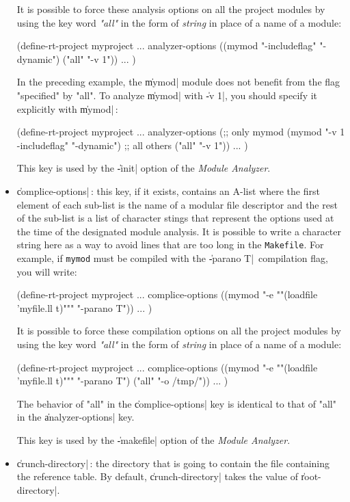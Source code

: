 \begin{itemize}
It is possible to force these analysis options on all the project modules by using the key word {\em "all"} in the form of {\it
string} in place of a name of a module:
\begin{Code*}
(define-rt-project myproject
  ...
  analyzer-options ((mymod "-includeflag" "-dynamic")
                    ("all" "-v 1"))
  ...
)
\end{Code*}
In the preceding example, the \|mymod| module does not benefit from the flag "specified" by "all".  To analyze \|mymod| with \|-v 1|, you should specify it explicitly with \|mymod|\,:
\begin{Code*}
(define-rt-project myproject
  ...
  analyzer-options (;; only mymod
                    (mymod "-v 1 -includeflag" "-dynamic")
                    ;; all others
                    ("all" "-v 1"))
  ...
)
\end{Code*}

This key is used by the \|-init| option of the {\em Module Analyzer}.

\item {\Large \|complice-options|}\,: 
this key, if it exists, contains an A-list
 where the first element of each sub-list is the name of a modular file descriptor and the rest of the sub-list is a list of character stings that represent the options used at the time of the designated module analysis.
It is possible to write a character string here as a way to avoid lines
that are too long in the {\tt Makefile}.
 For example, if {\tt mymod} must be 
compiled with the \|-parano T|\ compilation flag, you will write:
\begin{Code*}
(define-rt-project myproject
  ...
  complice-options ((mymod "-e ""(loadfile 'myfile.ll t)""" "-parano T"))
  ...
)
\end{Code*}

It is possible to force these compilation options on all the project modules by using the key word {\em "all"} in the form of {\it
string} in place of a name of a module:
\begin{Code*}
(define-rt-project myproject
  ...
  complice-options ((mymod "-e ""(loadfile 'myfile.ll t)""" "-parano T")
                    ("all" "-o /tmp/"))
  ...
)
\end{Code*}
The behavior of "all" in the \|complice-options| key is identical to that of "all" in the \|analyzer-options| key.

This key is used by the \|-makefile| option of the {\em Module Analyzer}.

\item {\Large \|crunch-directory|}\,: the directory that is going to contain the file containing the reference table.  By default, \|crunch-directory| takes the value of \|root-directory|.


\end{itemize}
